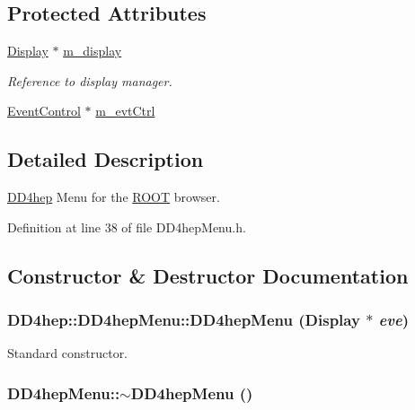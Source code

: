 \subsection*{Protected Attributes}
\begin{DoxyCompactItemize}
\item 
\hyperlink{class_d_d4hep_1_1_display}{Display} $\ast$ \hyperlink{class_d_d4hep_1_1_d_d4hep_menu_a684595fdba5b0f4fb8421ee39f75ad68}{m\_\-display}
\begin{DoxyCompactList}\small\item\em Reference to display manager. \item\end{DoxyCompactList}\item 
\hyperlink{class_d_d4hep_1_1_event_control}{EventControl} $\ast$ \hyperlink{class_d_d4hep_1_1_d_d4hep_menu_a3c5139077c3f664d0ab0bcde163466f6}{m\_\-evtCtrl}
\end{DoxyCompactItemize}


\subsection{Detailed Description}
\hyperlink{namespace_d_d4hep}{DD4hep} Menu for the \hyperlink{namespace_r_o_o_t}{ROOT} browser. 

Definition at line 38 of file DD4hepMenu.h.

\subsection{Constructor \& Destructor Documentation}
\hypertarget{class_d_d4hep_1_1_d_d4hep_menu_a3d62c983630ad5f2d7f31fbe8c3d3e3e}{
\subsubsection[{DD4hepMenu}]{\setlength{\rightskip}{0pt plus 5cm}DD4hep::DD4hepMenu::DD4hepMenu ({\bf Display} $\ast$ {\em eve})}}
\label{class_d_d4hep_1_1_d_d4hep_menu_a3d62c983630ad5f2d7f31fbe8c3d3e3e}


Standard constructor. \hypertarget{class_d_d4hep_1_1_d_d4hep_menu_ab6c197b60017a053af2d1d41e63574f2}{
\subsubsection[{$\sim$DD4hepMenu}]{\setlength{\rightskip}{0pt plus 5cm}DD4hepMenu::$\sim$DD4hepMenu ()}}
\label{class_d_d4hep_1_1_d_d4hep_menu_ab6c197b60017a053af2d1d41e63574f2}


